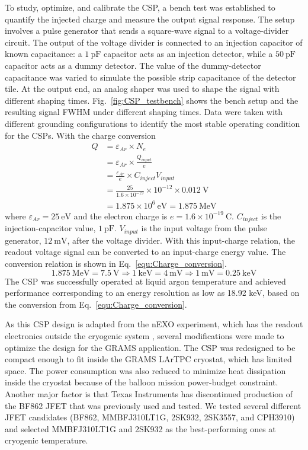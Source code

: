 To study, optimize, and calibrate the \ac{CSP}, a bench test was established to quantify the injected charge and measure the output signal response. The setup involves a pulse generator that sends a square-wave signal to a voltage-divider circuit. The output of the voltage divider is connected to an injection capacitor of known capacitance: a $1~\text{pF}$ capacitor acts as an injection detector, while a $50~\text{pF}$ capacitor acts as a dummy detector. The value of the dummy-detector capacitance was varied to simulate the possible strip capacitance of the detector tile. At the output end, an analog shaper was used to shape the signal with different shaping times. Fig.~\ref{fig:CSP_testbench} shows the bench setup and the resulting signal \ac{FWHM} under different shaping times. Data were taken with different grounding configurations to identify the most stable operating condition for the \ac{CSP}s. With the charge conversion
\begin{align}\label{equ:Charge_calculation}
    Q&=\varepsilon_{Ar}\times N_e\\
    &=\varepsilon_{Ar}\times \frac{Q_{input}}{e}\\
    &=\frac{\varepsilon_{Ar}}{e}\times C_{inject}V_{input}\\
    &=\frac{25}{1.6\times10^{-19}}\times10^{-12}\times0.012~\text{V}\\
    &=1.875\times10^6~\text{eV}=1.875~\text{MeV}
\end{align}
where $\varepsilon_{Ar}=25~\text{eV}$ and the electron charge is $e=1.6\times10^{-19}~\text{C}$. $C_{inject}$ is the injection-capacitor value, $1~\text{pF}$. $V_{input}$ is the input voltage from the pulse generator, $12~\text{mV}$, after the voltage divider. With this input-charge relation, the readout voltage signal can be converted to an input-charge energy value. The conversion relation is shown in Eq.~\ref{equ:Charge_conversion}.
\begin{equation}\label{equ:Charge_conversion}
    1.875~\text{MeV}=7.5~\text{V}\Longrightarrow 1~\text{keV}=4~\text{mV}\Longrightarrow 1~\text{mV}=0.25~\text{keV}
\end{equation}
The \ac{CSP} was successfully operated at liquid argon temperature and achieved performance corresponding to an energy resolution as low as 18.92 keV, based on the conversion from Eq.~\ref{equ:Charge_conversion}.

As this \ac{CSP} design is adapted from the nEXO experiment, which has the readout electronics outside the cryogenic system \cite{Li_2019}, several modifications were made to optimize the design for the GRAMS application. The \ac{CSP} was redesigned to be compact enough to fit inside the GRAMS LArTPC cryostat, which has limited space. The power consumption was also reduced to minimize heat dissipation inside the cryostat because of the balloon mission power-budget constraint. Another major factor is that Texas Instruments has discontinued production of the BF862 \ac{JFET} that was previously used and tested. We tested several different \ac{JFET} candidates (BF862, MMBFJ310LT1G, 2SK932, 2SK3557, and CPH3910) and selected MMBFJ310LT1G and 2SK932 as the best-performing ones at cryogenic temperature. 

